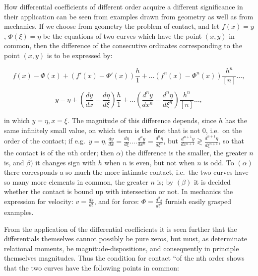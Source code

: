 \documentclass[12pt,a4paper,openany]{book}
\newcommand{\opage}[1]{\marginnote{\footnotesize\textit{[#1]}}}
\begin{document}
\setcounter{footnote}{0}%
\opage{87}How differential coefficients of different order acquire
a different significance in their application can be seen
\setcounter{footnote}{0}%
\opage{88}from examples drawn from geometry as well as from mechanics.
If we choose from geometry the problem of contact, and let $f(x)=y$, $\Phi(\xi)=\eta$ be the equations of two curves which
have the point $(x,y)$ in common, then the difference of the consecutive ordinates corresponding to the point $(x,y)$ is to be expressed by:

\[ f(x)-\Phi(x)+(f'(x)-\Phi'(x))\frac{h}{1}+\ldots(f^{n}(x)-\Phi^{n}(x))\frac{h^{n}}{[n]}\ldots, \]

\[ y-\eta+\left(\frac{dy}{dx}-\frac{d\eta}{d\xi}\right)\frac{h}{1}+\ldots\left(\frac{d^{n}y}{dx^{n}}-\frac{d^{n}\eta}{d\xi^{n}}\right)\frac{h^{n}}{[n]}\ldots, \]

in which $y=\eta, x=\xi$. The magnitude of this difference depends,
since $h$ has the same infinitely small value, on which
term is the first that is not $0$, i.e.\ on the order
of the contact; if e.g.\ $y=\eta, \frac{dy}{dx}=\frac{d\eta}{d\xi}\ldots.\frac{d^{n}y}{dx^{n}}=\frac{d^{n}\eta}{d\xi^{n}}$, but $\frac{d^{n+1}y}{dx^{n+1}}\gtrless\frac{d^{n+1}\eta}{d\xi^{n+1}}$,
so that the contact
is of the $n$th order; then $\alpha)$ the difference is the smaller, the greater $n$ is, and $\beta)$ it changes sign with $h$ when $n$ is even, but not when
$n$ is odd. To $(\alpha)$ there corresponds a so much the more intimate contact, i.e.\ the two curves have so many more elements in common, the greater $n$ is; by $(\beta)$ it is decided whether the contact is bound up
with intersection or not. In mechanics the expression
for velocity: $v=\frac{ds}{dt}$, and for force: $\Phi=\frac{d^{2}s}{dt^{2}}$ furnish easily grasped examples.

\setcounter{footnote}{0}%
\opage{89}From the application of the differential coefficients it is seen further
that the differentials themselves cannot possibly be pure zeros,
but must, as determinate relational moments, be magnitude-dispositions,
and consequently in principle themselves magnitudes. Thus
the condition for
contact ``of the nth order shows that the two
curves have the following points in common:
\end{document}
